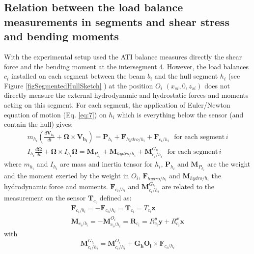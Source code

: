 \documentclass{article}
\begin{document}
\subsection{Relation between the load balance measurements in segments and shear stress and bending moments}
\label{FHydro}
With the experimental setup used the ATI balance measures directly the shear force and the bending moment at the intersegment 4. However, the load balances $c_i$ installed on each segment between the beam $b_i$ and the hull segment $h_i$ (see Figure \ref{figSegmentedHullSketch} ) at the position $O_i$ $(x_{si},0,z_{si})$ does not directly measure the external hydrodynamic and hydrostatic forces and moments acting on this segment. 
For each segment, the application of Euler/Newton equation of motion (Eq. \ref{eq:7}) on $h_i$ which is everything below the sensor (and contain the hull) gives:
\begin{equation}
\begin{array}{l}
\displaystyle  m_{h_i} (\frac{d\mathbf{V_{h_i}}}{dt}+\mathbf{\Omega} \times \mathbf{V_{h_i}})   =  \mathbf{P}_{h_i} +  \mathbf{F}_{hydro/h_i}  +  \mathbf{F}_{c_i/h_i} \, \, \text{ for each segment} \, i  \\
\displaystyle  I_{h_i}\frac{d\mathbf{\Omega}}{dt}+\mathbf{\Omega} \times  I_{h_i}\mathbf{\Omega} =  \mathbf{M}_{P_{h_i}} +  \mathbf{M}_{hydro/h_i}  +  \mathbf{M}^{G_h}_{c_i/h_i} \, \, \text{ for each segment} \, i
\end{array}
\end{equation}
where $m_{h_i}$ and $I_{h_i}$ are mass and inertia tensor for $h_i$, $\mathbf{P}_{h_i}$ and  $\mathbf{M}_{P_{h_i}}$ are the weight and the moment exerted by the weight in $O_i$, $\mathbf{F}_{hydro/h_i}$ and  $\mathbf{M}_{hydro/h_i}$ the hydrodynamic force and moments. 
 $\mathbf{F}_{c_i/h_i}$ and $\mathbf{M}^{G_h}_{c_i/h_i}$  are related to the measurement on the sensor $\mathbf{T}_{c_i}$  defined as:
\begin{equation}
\begin{array}{l}
\mathbf{F}_{c_i/b_i}   = - \mathbf{F}_{c_i/h_i} = \mathbf{T}_{c_i} = T_{c_i} \mathbf{z} \\
 \mathbf{M}_{c_i/b_i}   = - \mathbf{M}^{O_i}_{c_i/h_i} = \mathbf{R}_{c_i} = R^y_{c_i} \mathbf{y} + R^x_{c_i} \mathbf{x}
\end{array}
\end{equation}
with 
\begin{equation}
\mathbf{M}^{G_h}_{c_i/h_i}  = \mathbf{M}^{O_i}_{c_i/h_i} + \mathbf{G_h O_i} \times  \mathbf{F}_{c_i/h_i} 
\end{equation}
\end{document}
